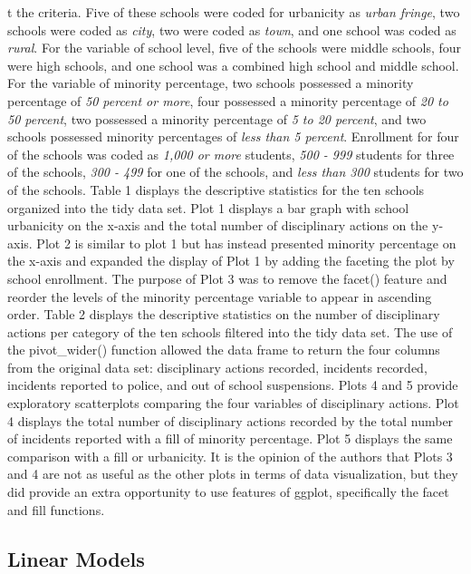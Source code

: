 \documentclass[
  man, fleqn, noextraspace]{apa6}
\begin{document}
t the criteria. Five of these schools were coded for urbanicity as \emph{urban fringe}, two schools were coded as \emph{city}, two were coded as \emph{town}, and one school was coded as \emph{rural}. For the variable of school level, five of the schools were middle schools, four were high schools, and one school was a combined high school and middle school. For the variable of minority percentage, two schools possessed a minority percentage of \emph{50 percent or more}, four possessed a minority percentage of \emph{20 to 50 percent}, two possessed a minority percentage of \emph{5 to 20 percent}, and two schools possessed minority percentages of \emph{less than 5 percent}. Enrollment for four of the schools was coded as \emph{1,000 or more} students, \emph{500 - 999} students for three of the schools, \emph{300 - 499} for one of the schools, and \emph{less than 300} students for two of the schools.
Table 1 displays the descriptive statistics for the ten schools organized into the tidy data set. Plot 1 displays a bar graph with school urbanicity on the x-axis and the total number of disciplinary actions on the y-axis. Plot 2 is similar to plot 1 but has instead presented minority percentage on the x-axis and expanded the display of Plot 1 by adding the faceting the plot by school enrollment. The purpose of Plot 3 was to remove the facet() feature and reorder the levels of the minority percentage variable to appear in ascending order. Table 2 displays the descriptive statistics on the number of disciplinary actions per category of the ten schools filtered into the tidy data set. The use of the pivot\_wider() function allowed the data frame to return the four columns from the original data set: disciplinary actions recorded, incidents recorded, incidents reported to police, and out of school suspensions. Plots 4 and 5 provide exploratory scatterplots comparing the four variables of disciplinary actions. Plot 4 displays the total number of disciplinary actions recorded by the total number of incidents reported with a fill of minority percentage. Plot 5 displays the same comparison with a fill or urbanicity. It is the opinion of the authors that Plots 3 and 4 are not as useful as the other plots in terms of data visualization, but they did provide an extra opportunity to use features of ggplot, specifically the facet and fill functions.

\hypertarget{linear-models-1}{%
\subsection{Linear Models}\label{linear-models-1}}
\end{document}
